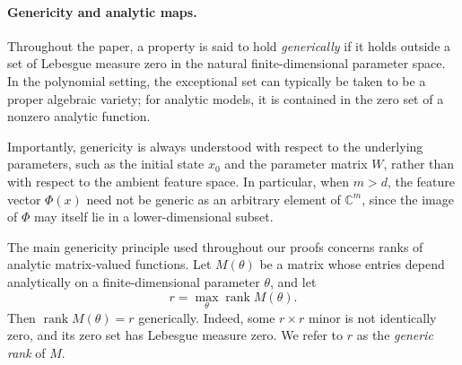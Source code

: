 \documentclass[11pt]{article}
\theoremstyle{plain}
\newtheorem{proposition}[theorem]{Proposition}
\theoremstyle{definition}
\theoremstyle{remark}
\newtheorem{remark}[theorem]{Remark}
\begin{document}



 
\paragraph{Genericity and analytic maps.}
Throughout the paper, a property is said to hold \emph{generically} if it
holds outside a set of Lebesgue measure zero in the natural finite-dimensional
parameter space. In the polynomial setting, the exceptional set can typically
be taken to be a proper algebraic variety; for analytic models, it is contained
in the zero set of a nonzero analytic function.

Importantly, genericity is always understood with respect to the underlying
parameters, such as the initial state \(x_0\) and the parameter matrix \(W\),
rather than with respect to the ambient feature space. In particular, when
\(m>d\), the feature vector \(\Phi(x)\) need not be generic as an arbitrary
element of \(\mathbb C^m\), since the image of \(\Phi\) may itself lie in a
lower-dimensional subset.

The main genericity principle used throughout our proofs concerns ranks of
analytic matrix-valued functions. Let \(M(\theta)\) be a matrix whose entries
depend analytically on a finite-dimensional parameter \(\theta\), and let
\[
r=\max_\theta \operatorname{rank} M(\theta).
\]
Then \(\operatorname{rank}M(\theta)=r\) generically. Indeed, some
\(r\times r\) minor is not identically zero, and its zero set has Lebesgue
measure zero. We refer to \(r\) as the \emph{generic rank} of \(M\).
\end{document}
